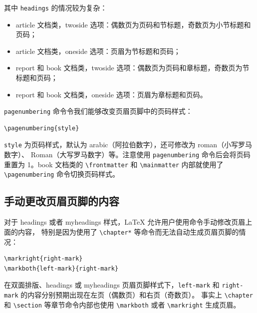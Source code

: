 其中 \texttt{headings} 的情况较为复杂：
\begin{itemize}
    \item {article} 文档类，{twoside} 选项：偶数页为页码和节标题，奇数页为小节标题和页码；
    \item {article} 文档类，{oneside} 选项：页眉为节标题和页码；
    \item {report} 和 {book} 文档类，{twoside} 选项：偶数页为页码和章标题，奇数页为节标题和页码；
    \item {report} 和 {book} 文档类，{oneside} 选项：页眉为章标题和页码。
\end{itemize}

\lstinline{pagenumbering} 命令令我们能够改变页眉页脚中的页码样式：
\begin{lstlisting}
\pagenumbering{style}
\end{lstlisting}

\lstinline{style} 为页码样式，默认为 {arabic}（阿拉伯数字），还可修改为 {roman}（小写罗马数字）、
{Roman}（大写罗马数字）等。注意使用 \lstinline{pagenumbering} 命令后会将页码重置为 1。{book} 文档类的 \lstinline{\frontmatter} 和 \lstinline{\mainmatter} 内部就使用了 \lstinline{\pagenumbering} 命令切换页码样式。

\subsection{手动更改页眉页脚的内容}\label{subsec:marks}

对于 headings 或者 myheadings 样式，\LaTeX{} 允许用户使用命令手动修改页眉上面的内容，
特别是因为使用了 \lstinline{\chapter*} 等命令而无法自动生成页眉页脚的情况：
\begin{lstlisting}
\markright{right-mark}
\markboth{left-mark}{right-mark}
\end{lstlisting}

在双面排版、{headings} 或 {myheadings} 页眉页脚样式下，\lstinline{left-mark} 和 \lstinline{right-mark} 的内容分别预期出现在左页（偶数页）和右页（奇数页）。
事实上 \lstinline{\chapter} 和 \lstinline{\section} 等章节命令内部也使用 \lstinline{\markboth} 或者 \lstinline{\markright} 生成页眉。

